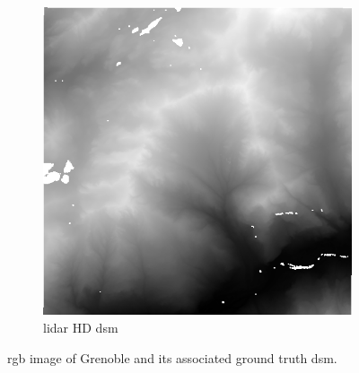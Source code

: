 \begin{figure}
\begin{subfigure}[t]{0.48\linewidth}
        \includegraphics[width=\linewidth]{Images/Chap_6/miniature_Grenoble_gt.png}
        \caption{\acrshort{lidar} HD \acrshort{dsm}}
        \label{fig:miniature_Grenoble_gt}
    \end{subfigure}
    \caption{\acrshort{rgb} image of Grenoble and its associated ground truth \acrshort{dsm}.}
    \label{fig:miniature_Grenoble}
\end{figure}

